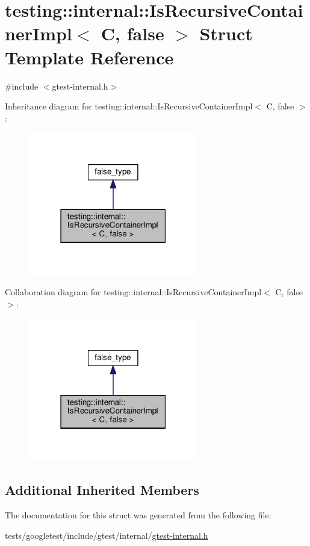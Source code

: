 \hypertarget{structtesting_1_1internal_1_1IsRecursiveContainerImpl_3_01C_00_01false_01_4}{}\section{testing\+:\+:internal\+:\+:Is\+Recursive\+Container\+Impl$<$ C, false $>$ Struct Template Reference}
\label{structtesting_1_1internal_1_1IsRecursiveContainerImpl_3_01C_00_01false_01_4}


{\ttfamily \#include $<$gtest-\/internal.\+h$>$}



Inheritance diagram for testing\+:\+:internal\+:\+:Is\+Recursive\+Container\+Impl$<$ C, false $>$\+:\nopagebreak
\begin{figure}[H]
\begin{center}
\leavevmode
\includegraphics[width=210pt]{structtesting_1_1internal_1_1IsRecursiveContainerImpl_3_01C_00_01false_01_4__inherit__graph}
\end{center}
\end{figure}


Collaboration diagram for testing\+:\+:internal\+:\+:Is\+Recursive\+Container\+Impl$<$ C, false $>$\+:\nopagebreak
\begin{figure}[H]
\begin{center}
\leavevmode
\includegraphics[width=210pt]{structtesting_1_1internal_1_1IsRecursiveContainerImpl_3_01C_00_01false_01_4__coll__graph}
\end{center}
\end{figure}
\subsection*{Additional Inherited Members}


The documentation for this struct was generated from the following file\+:\begin{DoxyCompactItemize}
\item 
tests/googletest/include/gtest/internal/\hyperlink{gtest-internal_8h}{gtest-\/internal.\+h}\end{DoxyCompactItemize}
